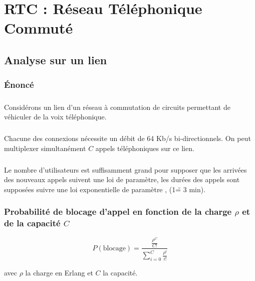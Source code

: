 %
\chapter{RTC : Réseau Téléphonique Commuté}
%
    \section{Analyse sur un lien}
        \label{seullien} %
%
        \subsection{Énoncé}
%
            \paragraph{}
Considérons un lien d'un réseau à commutation de circuits permettant de véhiculer de la voix téléphonique.
%
            \paragraph{}
Chacune des connexions nécessite un débit de 64 Kb/s bi-directionnels.
On peut multiplexer simultanément $C$ appels téléphoniques sur ce lien.
%
        \paragraph{}
Le nombre d'utilisateurs est suffisamment grand pour supposer que les arrivées des nouveaux appels suivent une loi de paramètre, les durées des appels sont supposées suivre une loi exponentielle de paramètre , (1\u = 3 min).
%
        \subsection{Probabilité de blocage d'appel en fonction de la charge $\rho$ et de la capacité $C$}
\[ P(\text{blocage}) = \frac{ \frac{ \rho^C }{ C! } }{ \sum\limits_{i=0}^C \frac{ \rho^i }{ i! } } \]
\begin{center}
    avec $\rho$ la charge en Erlang et $C$ la capacité.
\end{center}

